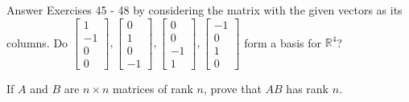 \documentclass[12pt,letterpaper]{hmcpset}
\begin{document}
\begin{solution}
\vfill
\end{solution}
\newpage

\begin{problem}[3.4.48]
Answer Exercises 45 - 48 by considering the matrix with the given vectors as its columns.
Do $\begin{bmatrix} 1 \\ -1 \\ 0 \\ 0 \end{bmatrix}, \begin{bmatrix} 0 \\ 1 \\ 0 \\ -1 \end{bmatrix}, \begin{bmatrix} 0 \\ 0 \\ -1 \\ 1 \end{bmatrix}, \begin{bmatrix} -1 \\ 0 \\ 1 \\ 0 \end{bmatrix}$ form a basis for $\mathbb{R}^4$?
\end{problem}

\begin{solution}
\vfill
\end{solution}
\newpage

\begin{problem}[3.5.58]
If $A$ and $B$ are $n \times n$ matrices of rank $n$, prove that $AB$ has rank $n$.
\end{problem}

\begin{solution}
\vfill
\end{solution}
\end{document}
